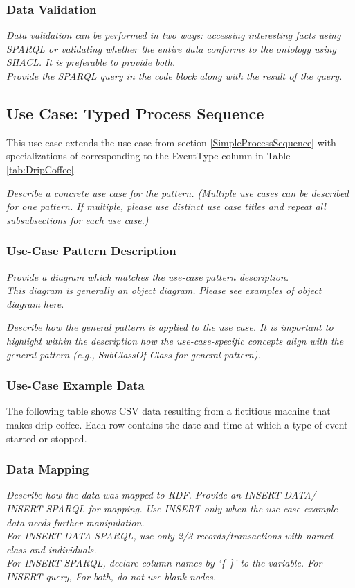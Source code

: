 \subsubsection*{Data Validation}
 \textit{ 
Data validation can be performed in two ways: accessing interesting facts using SPARQL or validating whether the entire data conforms to the ontology using SHACL. It is preferable to provide both. \\
Provide the SPARQL query in the code block along with the result of the query. \\
  }

\subsection*{Use Case: Typed Process Sequence}
This use case extends the use case from section \ref{SimpleProcessSequence} with specializations of  corresponding to the EventType column in Table \ref{tab:DripCoffee}.

 \textit{ 
Describe a concrete use case for the pattern. (Multiple use cases can be described for one pattern. If multiple, please use distinct use case titles and repeat all subsubsections for each use case.)
  }

\subsubsection*{Use-Case Pattern Description}
 \textit{ 
Provide a diagram which matches the use-case pattern description. \\
\noindent \textit{This diagram is generally an object diagram. Please see examples of object diagram here.}
  }

 \textit{ 
Describe how the general pattern is applied to the use case. It is important to highlight within the description how the use-case-specific concepts align with the general pattern (e.g., SubClassOf Class for general pattern).
  }

\subsubsection*{Use-Case Example Data}
The following table shows CSV data resulting from a fictitious machine that makes drip coffee. Each row contains the date and time at which a type of event started or stopped.




\subsubsection*{Data Mapping}
 \textit{ 
Describe how the data was mapped to RDF. Provide an INSERT DATA/ INSERT SPARQL for mapping. Use INSERT only when the use case example data needs further manipulation. \\
For INSERT DATA SPARQL, use only 2/3 records/transactions with named class and individuals. \\
For INSERT SPARQL, declare column names by `\{ \}' to the variable.  
For INSERT query, 
For both, do not use blank nodes.    
  }


